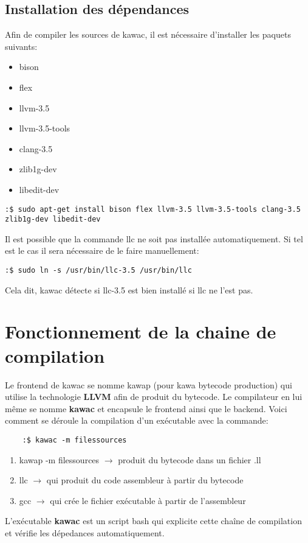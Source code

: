 \documentclass{../res/univ-projet}
\begin{document}
	\subsection{Installation des dépendances}
		Afin de compiler les sources de kawac, il est nécessaire d'installer les paquets suivants:
		\begin{itemize}
			\item bison
			\item flex
			\item llvm-3.5
			\item llvm-3.5-tools
			\item clang-3.5
			\item zlib1g-dev 
			\item libedit-dev
		\end{itemize}
                \begin{verbatim}
:$ sudo apt-get install bison flex llvm-3.5 llvm-3.5-tools clang-3.5 zlib1g-dev libedit-dev
\end{verbatim}

		Il est possible que la commande llc ne soit pas installée automatiquement. Si tel est le cas il sera nécessaire de le faire manuellement:\\
                \begin{verbatim}
:$ sudo ln -s /usr/bin/llc-3.5 /usr/bin/llc
\end{verbatim}
  Cela dit, kawac détecte si llc-3.5 est bien installé si llc ne l'est pas.


 \section{Fonctionnement de la chaine de compilation}
  Le frontend de kawac se nomme kawap (pour kawa bytecode production) qui utilise la technologie \textbf{LLVM} afin de produit du bytecode. Le compilateur en lui même se nomme \textbf{kawac} et encapsule le frontend ainsi que le backend. Voici comment se déroule la compilation d'un exécutable avec la commande:\\
  \begin{verbatim}
    :$ kawac -m filessources
  \end{verbatim}

  \begin{enumerate}
    \item kawap -m filessources $\rightarrow$ produit du bytecode dans un fichier .ll
    \item llc $\rightarrow$ qui produit du code assembleur à partir du bytecode
    \item gcc $\rightarrow$ qui crée le fichier exécutable à partir de l'assembleur
  \end{enumerate}

  L'exécutable \textbf{kawac} est un script bash qui explicite cette chaîne de compilation et vérifie les dépedances automatiquement.
\end{document}
